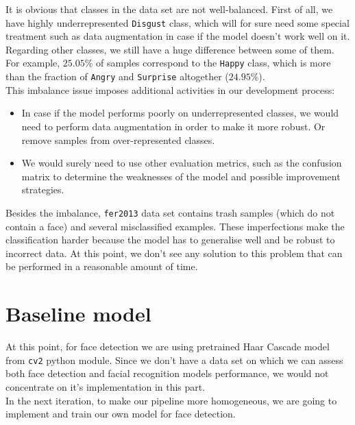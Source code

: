It is obvious that classes in the data set are not well-balanced. First of all, we have highly underrepresented \texttt{Disgust} class, which will for sure need some special treatment such as data augmentation in case if the model doesn't work well on it.\\

Regarding other classes, we still have a huge difference between some of them. For example, $25.05\%$ of samples correspond to the \texttt{Happy} class, which is more than the fraction of \texttt{Angry} and \texttt{Surprise} altogether ($24.95\%$).\\ 

This imbalance issue imposes additional activities in our development process:

\begin{itemize}
    \item 
    In case if the model performs poorly on underrepresented classes, we would need to perform data augmentation in order to make it more robust. Or remove samples from over-represented classes.
    \item
    We would surely need to use other evaluation metrics, such as the confusion matrix to determine the weaknesses of the model and possible improvement strategies.
\end{itemize}

Besides the imbalance, \texttt{fer2013} data set contains trash samples (which do not contain a face) and several misclassified examples. These imperfections make the classification harder because the model has to generalise well and be robust to incorrect data. At this point, we don't see any solution to this problem that can be performed in a reasonable amount of time.

\section{Baseline model}


At this point, for face detection we are using pretrained Haar Cascade model from \texttt{cv2} python module. Since we don't have a data set on which we can assess both face detection and facial recognition models performance, we would not concentrate on it's implementation in this part.\\

In the next iteration, to make our pipeline more homogeneous, we are going to implement and train our own model for face detection.\\

